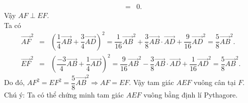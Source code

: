 \begin{ex}
{\begin{itemchoice}
\begin{eqnarray*}
				 &=&0.
			\end{eqnarray*}
			Vậy $ AF\perp EF$. \\ 
			Ta có \begin{eqnarray*}
			 \overrightarrow{A F}^2&=&\left(\dfrac{1}{4} \overrightarrow{A B}+\dfrac{3}{4} \overrightarrow{A D}\right)^2=\dfrac 1{16} \overrightarrow{A B}^2+\dfrac{3}{8} \overrightarrow{A B} \cdot \overrightarrow{A D}+\dfrac 9{16} \overrightarrow{A D}^2=\dfrac{5}{8} \overrightarrow{A B}^2.\\
			\overrightarrow{EF}^2&=&{{\left( \dfrac{-3}  4\overrightarrow{AB}+\dfrac{1}{4}\overrightarrow{AD} \right)}^2}=\dfrac 9{16}{{\overrightarrow{AB}}^2}-\dfrac{3}{8}\overrightarrow{AB}\cdot \overrightarrow{AD}+\dfrac 1{16}{{\overrightarrow{AD}}^2}=\dfrac{5}{8}{\overrightarrow{AB}}^2.
		\end{eqnarray*}
		Do đó, $A F^2=E F^2=\dfrac{5}{8} \overrightarrow{A B}^2 \Rightarrow A F=E F$. Vậy tam giác ${A E F}$ vuông cân tại ${F}$.\\ 
		Chú ý: Ta có thể chứng minh tam giác ${A E F}$ vuông bằng định  lí Pythagore.
	\end{itemchoice}
} 
\end{ex}

